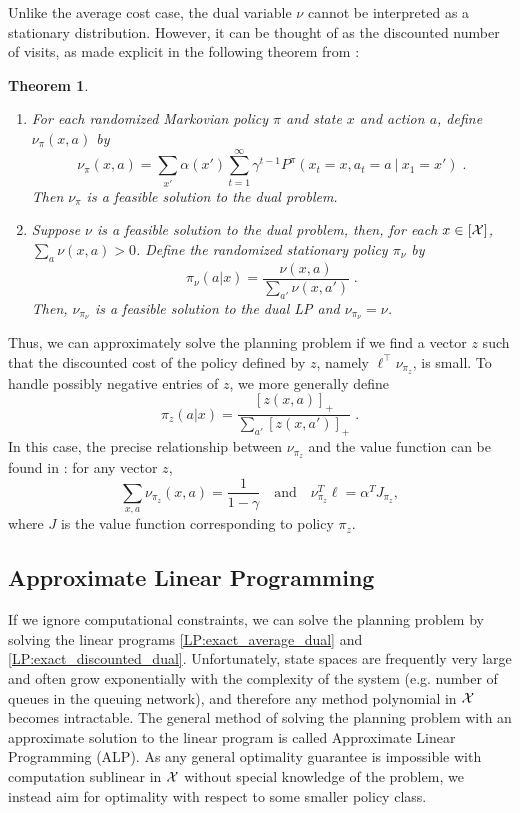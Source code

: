 \documentclass[11pt]{article}
\newtheorem{theorem}{Theorem}
\begin{document}
Unlike the average cost case, the dual variable $\nu$ cannot be interpreted as a stationary distribution. However, it can be thought of as the discounted number of visits, as made explicit in the  following theorem from \citet{Puterman:MDP}:
\begin{theorem}
\label{thm:dual-lp-mdp}
\begin{enumerate}
\item  For each randomized Markovian policy $\pi$ and state $x$ and action $a$, define $\nu_\pi(x,a)$ by
\[
\nu_\pi(x,a) = \sum_{x'} \alpha (x') \sum_{t=1}^\infty \gamma^{t-1} P^\pi (x_t = x, a_t = a \ | \ x_1 = x') \;.
\]
Then $\nu_\pi$ is a feasible solution to the dual problem.
\item Suppose $\nu$ is a feasible solution to the dual problem, then, for each $x\in[{\cal X}]$, $\sum_a \nu(x,a) > 0$. Define the randomized stationary policy $\pi_\nu$ by
\[
\pi_\nu(a | x) = \frac{\nu(x,a)}{\sum_{a'}\nu(x,a')} \;.
\]
Then, $\nu_{\pi_\nu}$ is a feasible solution to the dual LP and $\nu_{\pi_\nu} = \nu$.
\end{enumerate}
\end{theorem}
Thus, we can approximately solve the planning problem if we find a vector $z$ such that the discounted cost of the policy defined by $z$, namely $\ell^\top \nu_{\pi_z}$, is small. To handle possibly negative entries of $z$, we more generally define
\[
\pi_z(a | x) = \frac{\left[z(x,a)\right]_+}{\sum_{a'}\left[z(x,a')\right]_+} \;.
\]
In this case, the precise relationship between $\nu_{\pi_z}$ and the value function can be found in  \cite{Puterman:MDP}: for any vector $z$,
\begin{equation}
  \sum_{x,a} \nu_{\pi_{z}}(x,a)=\frac{1}{1-\gamma} \quad\text{and}\quad
  \nu_{\pi_z}^T \ell = \alpha^T J_{\pi_z},
  \label{eq:primal_dual_rel}
\end{equation}
where $J$ is the value function corresponding to policy $\pi_z$.

\subsection{Approximate Linear Programming}
If we ignore computational constraints, we can solve the planning problem by solving the linear programs  \eqref{LP:exact_average_dual} and \eqref{LP:exact_discounted_dual}. Unfortunately, state spaces are frequently very large and often grow exponentially with the complexity of the system (e.g. number of queues in the queuing network), and therefore any method polynomial in ${\cal X}$ becomes intractable. The general method of solving the planning problem with an approximate solution to the linear program is called Approximate Linear Programming (ALP). As any general optimality guarantee is impossible with computation sublinear in ${\cal X}$ without special knowledge of the problem, we instead aim for optimality with respect to some smaller policy class.
\end{document}

